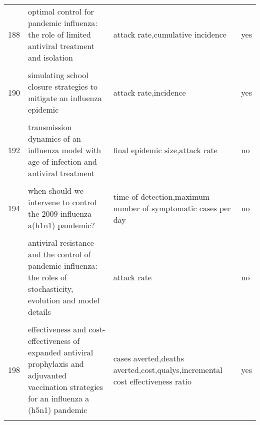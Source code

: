\documentclass[
]{article}
\begin{document}
\begin{landscape}
\begin{longtable}{l>{\raggedright\arraybackslash}p{4cm}>{\raggedright\arraybackslash}p{6cm}l}
188 & optimal control for pandemic influenza: the role of limited antiviral treatment and isolation & attack rate,cumulative incidence & yes\\
\cellcolor{gray!6}{189} & \cellcolor{gray!6}{optimizing vaccine allocation at different points in time during an epidemic} & \cellcolor{gray!6}{attack rate,hospitalizations,case fatality} & \cellcolor{gray!6}{yes}\\
190 & simulating school closure strategies to mitigate an influenza epidemic & attack rate,incidence & yes\\
\addlinespace
\cellcolor{gray!6}{191} & \cellcolor{gray!6}{the effect of mask use on the spread of influenza during a pandemic} & \cellcolor{gray!6}{attack rate,r0} & \cellcolor{gray!6}{no}\\
192 & transmission dynamics of an influenza model with age of infection and antiviral treatment & final epidemic size,attack rate & no\\
\cellcolor{gray!6}{193} & \cellcolor{gray!6}{transmission risks and control of foot-and-mouth disease in the netherlands: spatial patterns} & \cellcolor{gray!6}{effective reproduction number} & \cellcolor{gray!6}{yes}\\
194 & when should we intervene to control the 2009 influenza a(h1n1) pandemic? & time of detection,maximum number of symptomatic cases per day & no\\
\cellcolor{gray!6}{195} & \cellcolor{gray!6}{adaptive vaccination strategies to mitigate pandemic influenza} & \cellcolor{gray!6}{timing of peak,hospitalizations,deaths} & \cellcolor{gray!6}{no}\\
\addlinespace
196 & antiviral resistance and the control of pandemic influenza: the roles of stochasticity, evolution and model details & attack rate & no\\
\cellcolor{gray!6}{197} & \cellcolor{gray!6}{economic evaluation of influenza pandemic mitigation strategies in the united states using a stochastic microsimulation transmission model} & \cellcolor{gray!6}{outbreak duration and timing,cost} & \cellcolor{gray!6}{yes}\\
198 & effectiveness and cost-effectiveness of expanded antiviral prophylaxis and adjuvanted vaccination strategies for an influenza a (h5n1) pandemic & cases averted,deaths averted,cost,qualys,incremental cost effectiveness ratio & yes\\
\cellcolor{gray!6}{199} & \cellcolor{gray!6}{engineering responses to pandemics} & \cellcolor{gray!6}{final epidemic size} & \cellcolor{gray!6}{no}\\

\end{longtable}
\end{landscape}
\end{document}
